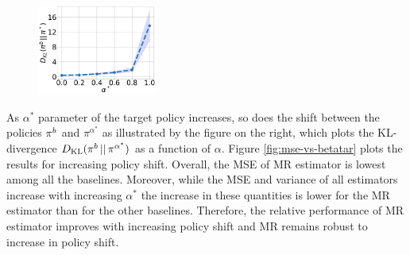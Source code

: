 \begin{figure}
    \centering
    \includegraphics[width=0.35\textwidth]{figures/mr/kl-divergence-w-uncertainty.png}
\end{figure}
As $\alpha^\ast$ parameter of the target policy increases, so does the shift between the policies $\pi^b$ and $\pi^{\alpha^\ast}$ as illustrated by the figure on the right, which plots the KL-divergence $D_{\textup{KL}}(\pi^b\, || \, \pi^{\alpha^\ast})$ as a function of $\alpha$.
Figure \ref{fig:mse-vs-betatar} plots the results for increasing policy shift. 
Overall, the MSE of MR estimator is lowest among all the baselines. Moreover, while the MSE and variance of all estimators increase with increasing $\alpha^\ast$ the increase in these quantities is lower for the MR estimator than for the other baselines. Therefore, the relative performance of MR estimator improves with increasing policy shift and MR remains robust to increase in policy shift.

